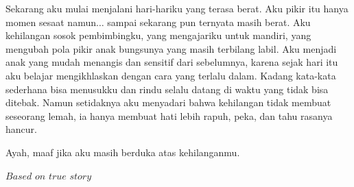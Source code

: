 Sekarang aku mulai menjalani hari-hariku yang terasa berat. Aku pikir itu hanya momen sesaat namun\(\dots\) sampai sekarang pun ternyata masih berat. Aku kehilangan sosok pembimbingku, yang mengajariku untuk mandiri, yang mengubah pola pikir anak bungsunya yang masih terbilang labil. Aku menjadi anak yang mudah menangis dan sensitif dari sebelumnya, karena sejak hari itu aku belajar mengikhlaskan dengan cara yang terlalu dalam. Kadang kata-kata sederhana bisa menusukku dan rindu selalu datang di waktu yang tidak bisa ditebak. Namun setidaknya aku menyadari bahwa kehilangan tidak membuat seseorang lemah, ia hanya membuat hati lebih rapuh, peka, dan tahu rasanya hancur.

Ayah, maaf jika aku masih berduka atas kehilanganmu.

\(\textit{Based on true story}\)

\jedahias
